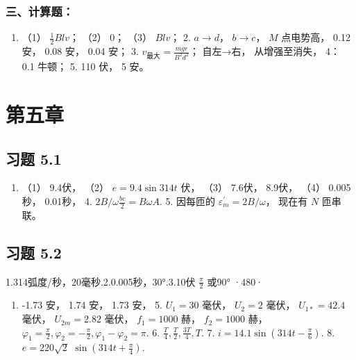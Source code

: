 \subsubsection{三、计算题：}\label{ux4e09ux8ba1ux7b97ux9898-3}

\begin{enumerate}
\def\labelenumi{\arabic{enumi}.}
\tightlist
\item
  （1） \(\frac{1}{2} B l v\)； （2） 0； （3） \(B l v\)； 2.
  \(a \to d\)， \(b \to c\)， \(M\) 点电势高， 0.12 安， 0.08 安， 0.04
  安； 3. \(v_{\text{最大}} = \frac{m g r}{B ^2 d^2}\)； 自左→右，
  从增强至消失， 4： 0.1 牛顿； 5. 110 伏， 5 安。
\end{enumerate}

\section{第五章}\label{ux7b2cux4e94ux7ae0}

\subsection{习题 5.1}\label{ux4e60ux9898-5.1-1}

\begin{enumerate}
\def\labelenumi{\arabic{enumi}.}
\setcounter{enumi}{2}
\tightlist
\item
  （1） 9.4伏， （2） \(e = 9.4\sin 314t\) 伏， （3） 7.6伏， 8.9伏，
  （4） 0.005秒， 0.01秒， 4. \(2B / \omega \frac{bc}{2} = B\omega A\).
  5. 因每匝的 \(\varepsilon_{m}^{\prime} = 2B / \omega\)， 现在有 \(N\)
  匝串联。
\end{enumerate}

\subsection{习题 5.2}\label{ux4e60ux9898-5.2-1}

1.314弧度/秒，20毫秒.2.0.005秒，30°.3.10伏 \(\frac{\pi}{2}\) 或90° ·480·

\begin{enumerate}
\def\labelenumi{\arabic{enumi}.}
\setcounter{enumi}{3}
\tightlist
\item
  -1.73 安， 1.74 安， 1.73 安， 5. \(U_{1} = 30\) 毫伏， \(U_{2} = 2\)
  毫伏， \(U_{1*} = 42.4\) 毫伏， \(U_{2m} = 2.82\) 毫伏，
  \(f_{1} = 1000\) 赫， \(f_{2} = 1000\) 赫，
  \(\varphi_{1} = \frac{\pi}{2}, \varphi_{2} = -\frac{\pi}{2}, \varphi_{1} - \varphi_{2} = \pi\).
  6. \(\frac{T}{4}, \frac{T}{2}, \frac{3T}{4}, T\). 7.
  \(i = 14.1 \sin \left(314t - \frac{\pi}{6}\right)\). 8.
  \(e = 220\sqrt{2}\) \(\sin \left(314t + \frac{\pi}{4}\right)\).
\end{enumerate}

